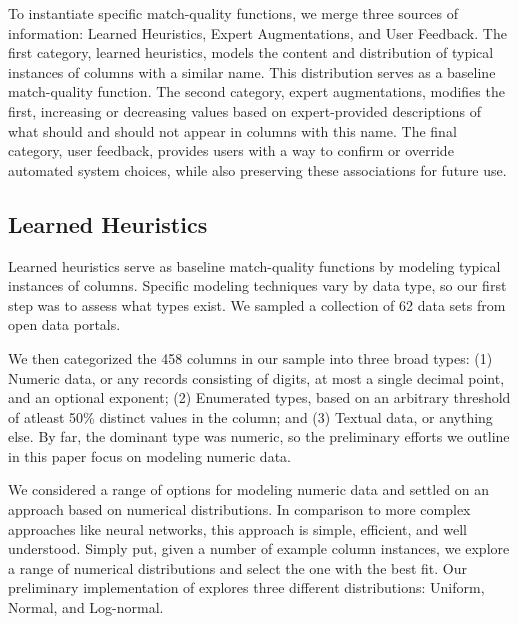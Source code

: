 
To instantiate specific match-quality functions, we merge three sources of information: Learned Heuristics, Expert Augmentations, and User Feedback. 
The first category, learned heuristics, models the content and distribution of typical instances of columns with a similar name.
This distribution serves as a baseline match-quality function.
The second category, expert augmentations, modifies the first, increasing or decreasing values based on expert-provided descriptions of what should and should not appear in columns with this name.
The final category, user feedback, provides users with a way to confirm or override automated system choices, while also preserving these associations for future use.

\subsection{Learned Heuristics}
Learned heuristics serve as baseline match-quality functions by modeling typical instances of columns.
Specific modeling techniques vary by data type, so our first step was to assess what types exist.
We sampled a collection of 62 data sets from open data portals. 

We then categorized the 458 columns in our sample into three broad types: 
(1) Numeric data, or any records consisting of digits, at most a single decimal point, and an optional exponent; 
(2) Enumerated types, based on an arbitrary threshold of atleast 50\% distinct values in the column; and 
(3) Textual data, or anything else.  
By far, the dominant type was numeric, so the preliminary efforts we outline in this paper focus on modeling numeric data.

We considered a range of options for modeling numeric data and settled on an approach based on numerical distributions.
In comparison to more complex approaches like neural networks, this approach is simple, efficient, and well understood.
Simply put, given a number of example column instances, we explore a range of numerical distributions and select the one with the best fit.
Our preliminary implementation of \systemname explores three different distributions: Uniform, Normal, and Log-normal. 

